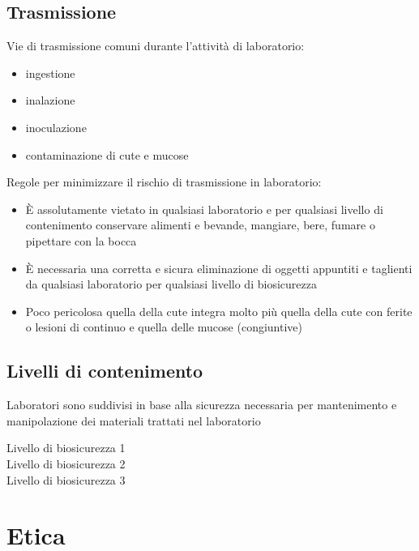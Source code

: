 \documentclass[a4paper]{article}
\begin{document}
\subsection{Trasmissione}
Vie di trasmissione comuni durante l'attività di laboratorio:
\begin{itemize}
    \item ingestione
    \item inalazione
    \item inoculazione
    \item contaminazione di cute e mucose
\end{itemize}
Regole per minimizzare il rischio di trasmissione in laboratorio:
\begin{itemize}
    \item È assolutamente vietato in qualsiasi laboratorio e per qualsiasi livello di contenimento conservare
    alimenti e bevande, mangiare, bere, fumare o pipettare con la bocca
    \item È necessaria una corretta e sicura eliminazione di oggetti appuntiti e taglienti da qualsiasi laboratorio
    per qualsiasi livello di biosicurezza
    \item Poco pericolosa quella della cute integra molto più quella della cute con ferite o lesioni di continuo e
    quella delle mucose (congiuntive)
\end{itemize}
\subsection{Livelli di contenimento}
Laboratori sono suddivisi in base alla sicurezza necessaria per mantenimento e manipolazione dei
materiali trattati nel laboratorio
\begin{description}
    \item[Livello di biosicurezza 1]
    \item[Livello di biosicurezza 2]
    \item[Livello di biosicurezza 3]
\end{description}
\section{Etica}
\end{document}
